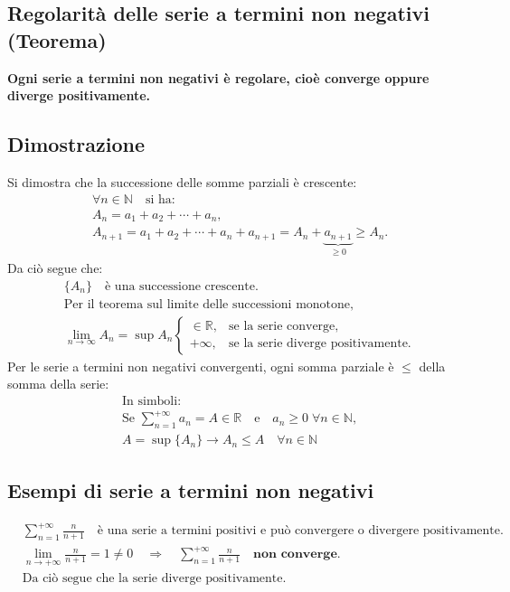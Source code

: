 \documentclass{article}
\begin{document}
\subsection*{Regolarità delle serie a termini non negativi (Teorema)}
\textbf{Ogni serie a termini non negativi è regolare, cioè converge oppure diverge positivamente.}

\subsection*{Dimostrazione}
Si dimostra che la successione delle somme parziali è crescente:
\begin{align*}
    &\forall n \in \mathbb{N} \quad \text{si ha:} \\
    &A_n = a_1 + a_2 + \cdots + a_n, \\
    &A_{n+1} = a_1 + a_2 + \cdots + a_n + a_{n+1} = A_n + \underbrace{a_{n+1}}_{\geq 0} \geq A_n.
\end{align*}
Da ciò segue che:
\begin{align*}
    &\{A_n\} \quad \text{è una successione crescente.} \\
    &\text{Per il teorema sul limite delle successioni monotone,} \\
    &\lim_{n \to \infty} A_n = \sup A_n \begin{cases}
        \in \mathbb{R}, & \text{se la serie converge}, \\
        +\infty, & \text{se la serie diverge positivamente.}
    \end{cases}
\end{align*}
Per le serie a termini non negativi convergenti, ogni somma parziale è $\leq$ della somma della serie:
\begin{align*}
    &\text{In simboli:} \\
    &\text{Se } \sum_{n=1}^{+\infty} a_n = A \in \mathbb{R} \quad \text{e} \quad a_n \geq 0 \; \forall n \in \mathbb{N}, \\
    &A = \sup \{A_n\} \to A_n \leq A \quad \forall n \in \mathbb{N}
\end{align*}

\subsection*{Esempi di serie a termini non negativi}
\begin{align*}
    &\sum_{n=1}^{+\infty} \frac{n}{n+1} \quad \text{è una serie a termini positivi e può convergere o divergere positivamente.} \\
    &\lim_{n \to +\infty} \frac{n}{n+1} = 1 \neq 0 \quad \Rightarrow \quad \sum_{n=1}^{+\infty} \frac{n}{n+1} \quad \textbf{non converge.} \\
    &\text{Da ciò segue che la serie diverge positivamente.}
\end{align*}
\end{document}
